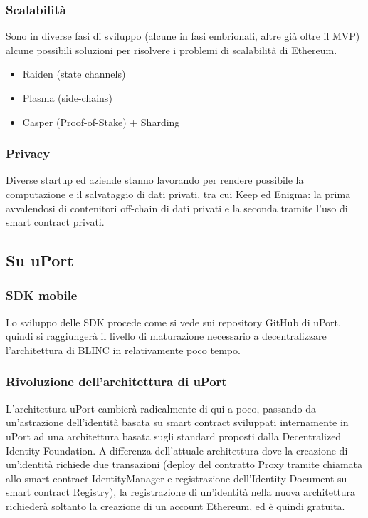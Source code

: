 \subsubsection{Scalabilità}

Sono in diverse fasi di sviluppo (alcune in fasi embrionali, altre già oltre il MVP)
alcune possibili soluzioni per risolvere i problemi di scalabilità di Ethereum.

\begin{itemize}
  \item Raiden (state channels)
  \item Plasma (side-chains)
  \item Casper (Proof-of-Stake) + Sharding
\end{itemize}

\subsubsection{Privacy}

Diverse startup ed aziende stanno lavorando per rendere possibile la computazione
e il salvataggio di dati privati, tra cui Keep ed Enigma: la prima avvalendosi di contenitori
off-chain di dati privati e la seconda tramite l’uso di smart contract privati.

\subsection{Su uPort}

\subsubsection{SDK mobile}

Lo sviluppo delle SDK procede come si vede sui repository GitHub di uPort,
quindi si raggiungerà il livello di maturazione necessario a decentralizzare
l’architettura di BLINC in relativamente poco tempo.

\subsubsection{Rivoluzione dell'architettura di uPort}

L’architettura uPort cambierà radicalmente di qui a poco, passando da un’astrazione
dell’identità basata su smart contract sviluppati internamente in uPort ad una architettura
basata sugli standard proposti dalla Decentralized Identity Foundation.
A differenza dell’attuale architettura dove la creazione di un’identità richiede
due transazioni (deploy del contratto Proxy tramite chiamata allo smart contract IdentityManager
e registrazione dell’Identity Document su smart contract Registry), la registrazione
di un’identità nella nuova architettura richiederà soltanto
la creazione di un account Ethereum, ed è quindi gratuita.

